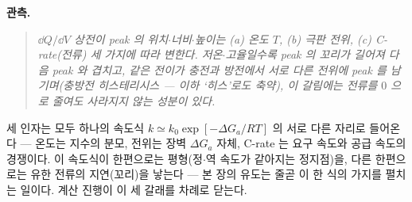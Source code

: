 \textbf{관측.}
\begin{quote}\itshape
$\dd Q/\dd V$ 상전이 peak 의 위치$\cdot$너비$\cdot$높이는 (a) 온도 $T$, (b) 극판 전위, (c) C-rate(전류)
세 가지에 따라 변한다. 저온$\cdot$고율일수록 peak 의 꼬리가 길어져 다음 peak 와 겹치고, 같은 전이가 충전과 방전에서
서로 다른 전위에 peak 를 남기며(충방전 히스테리시스 --- 이하 `히스'로도 축약), 이 갈림에는 전류를 $0$ 으로 줄여도 사라지지 않는 성분이 있다.
\end{quote}

세 인자는 모두 하나의 속도식 $k\simeq k_0\exp[-\Delta G_a/RT]$ 의 서로 다른 자리로 들어온다 --- 온도는 지수의 분모,
전위는 장벽 $\Delta G_a$ 자체, C-rate 는 요구 속도와 공급 속도의 경쟁이다. 이 속도식이 한편으로는 평형(정$\cdot$역
속도가 같아지는 정지점)을, 다른 한편으로는 유한 전류의 지연(꼬리)을 낳는다 --- 본 장의 유도는 줄곧 이 한 식의 가지를
펼치는 일이다. 계산 진행이 이 세 갈래를 차례로 닫는다.

